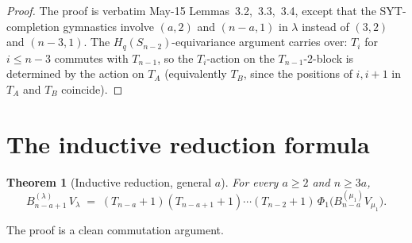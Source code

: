 \documentclass[11pt]{article}
\newtheorem{theorem}{Theorem}
\theoremstyle{definition}
\begin{document}
\begin{proof}
The proof is verbatim May-15 Lemmas~3.2,~3.3,~3.4, except that
the SYT-completion gymnastics involve $(a,2)$ and $(n-a,1)$ in
$\lambda$ instead of $(3,2)$ and $(n-3,1)$.  The
$H_q(S_{n-2})$-equivariance argument carries over: $T_i$ for
$i\le n-3$ commutes with $T_{n-1}$, so the $T_i$-action on the
$T_{n-1}$-$2$-block is determined by the action on $T_A$
(equivalently $T_B$, since the positions of $i,i+1$ in $T_A$ and
$T_B$ coincide).
\end{proof}

\section{The inductive reduction formula}\label{sec:reduction}

\begin{theorem}[Inductive reduction, general $a$]\label{thm:reduction}
For every $a\ge 2$ and $n\ge 3a$,
\begin{equation}\label{eq:gen-reduction}
   B_{n-a+1}^{(\lambda)}\,V_\lambda
   \;=\;
   (T_{n-a}{+}1)(T_{n-a+1}{+}1)\cdots(T_{n-2}{+}1)\,
   \Phi_1\big(B_{n-a}^{(\mu_1)} V_{\mu_1}\big).
\end{equation}
\end{theorem}

The proof is a clean commutation argument.
\end{document}
